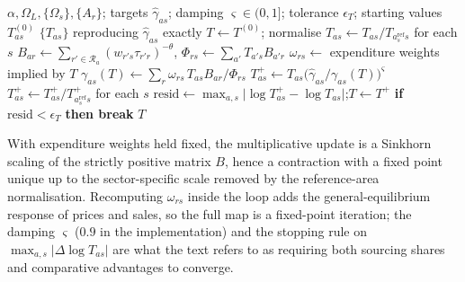 \begin{algorithm}[H]
\caption{\textsc{InvertT}: comparative advantage by matrix scaling with
general-equilibrium expenditure weights}
\label{alg:invertT}
\begin{algorithmic}[1]
\Require $\alpha,\Omega_L,\{\Omega_s\},\{A_r\}$; targets $\widehat{\gamma}_{as}$;
  damping $\varsigma\in(0,1]$; tolerance $\epsilon_T$; starting values $T^{(0)}_{as}$
\Ensure $\{T_{as}\}$ reproducing $\widehat{\gamma}_{as}$ exactly
\State $T\gets T^{(0)}$; normalise $T_{as}\gets T_{as}/T_{a_s^{\text{ref}}s}$ for each $s$
    \State $B_{ar}\gets\sum_{r'\in\mathcal{R}_a}(w_{r's}\tau_{r'r})^{-\theta}$,\quad
      $\Phi_{rs}\gets\sum_{a'}T_{a's}B_{a'r}$
    \State $\omega_{rs}\gets$ expenditure weights implied by $T$
    \State $\gamma_{as}(T)\gets\sum_r\omega_{rs}\,T_{as}B_{ar}/\Phi_{rs}$
    \State $T^{+}_{as}\gets T_{as}\bigl(\widehat{\gamma}_{as}/\gamma_{as}(T)\bigr)^{\varsigma}$
    \State $T^{+}_{as}\gets T^{+}_{as}/T^{+}_{a^{\text{ref}}_s s}$ for each $s$
    \State $\text{resid}\gets\max_{a,s}\bigl|\log T^{+}_{as}-\log T_{as}\bigr|$;\quad $T\gets T^{+}$
    \State \textbf{if} $\text{resid}<\epsilon_T$ \textbf{then break}
\EndFor
\State \Return $T$
\end{algorithmic}
\end{algorithm}

With expenditure weights held fixed, the multiplicative update is a Sinkhorn scaling of the strictly positive matrix
$B$, hence a contraction with a fixed point unique up to the sector-specific
scale removed by the reference-area normalisation. Recomputing $\omega_{rs}$
inside the loop adds the general-equilibrium response of prices and sales, so
the full map is a fixed-point iteration; the damping $\varsigma$ ($0.9$ in the
implementation) and the stopping rule on $\max_{a,s}|\Delta\log T_{as}|$ are what
the text refers to as requiring both sourcing shares and comparative advantages
to converge.

